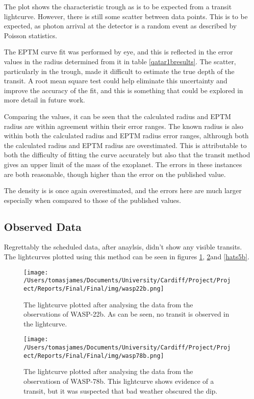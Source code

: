 \documentclass{report}
\begin{document}
The plot shows the characteristic trough as is to be expected from a transit lightcurve. However, there is still some scatter between data points. This is to be expected, as photon arrival at the detector is a random event as described by Poisson statistics. 

The EPTM curve fit was performed by eye, and this is reflected in the error values in the radius determined from it in table \ref{qatar1bresults}. The scatter, particularly in the trough, made it difficult to estimate the true depth of the transit. A root mean square test could help eliminate this uncertainty and improve the accuracy of the fit, and this is something that could be explored in more detail in future work. 

Comparing the values, it can be seen that the calculated radius and EPTM radius are within agreement within their error ranges. The known radius is also within both the calculated radius and EPTM radius error ranges, althrough both the calculated radius and EPTM radius are overstimated. This is attributable to both the difficulty of fitting the curve accurately but also that the transit method gives an upper limit of the mass of the exoplanet. The errors in these instances are both reasonable, though higher than the error on the published value. 

The density is is once again overestimated, and the errors here are much larger especially when compared to those of the published values. 

\subsection{Observed Data}
Regrettably the scheduled data, after anaylsis, didn't show any visible transits. The lightcurves plotted using this method can be seen in figures \ref{wasp22b}, \ref{wasp78b}and \ref{hats5b}.

\begin{figure}[H]
\centering
    \texttt{[image: /Users/tomasjames/Documents/University/Cardiff/Project/Project/Reports/Final/Final/img/wasp22b.png]}
\caption{The lightcurve plotted after analysing the data from the observations of WASP-22b. As can be seen, no transit is observed in the lightcurve.} \label{wasp22b}
\end{figure}

\begin{figure}[H]
\centering
    \texttt{[image: /Users/tomasjames/Documents/University/Cardiff/Project/Project/Reports/Final/Final/img/wasp78b.png]}
\caption{The lightcurve plotted after analysing the data from the observatiosn of WASP-78b. This lightcurve shows evidence of a transit, but it was suspected that bad weather obscured the dip.} \label{wasp78b}
\end{figure}
\end{document}

